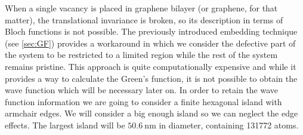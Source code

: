 %



When a single vacancy is placed in graphene bilayer (or graphene, for that matter), the translational invariance is broken, so its description in terms of Bloch functions is not possible. The previously introduced embedding technique (see \ref{sec:GF}) provides a workaround in which we consider the defective part of the system to be restricted to a limited region while the rest of the system remains pristine.
This approach is quite computationally expensive and while it provides a way to calculate the Green's function, it is not possible to obtain the wave function which will be necessary later on.
In order to retain the wave function information we are going to consider a finite hexagonal island with armchair edges. We will consider a big enough island so we can neglect the edge effects. The largest island will be $\SI{50.6}{\nm}$ in diameter, containing 131772 atoms.  %

